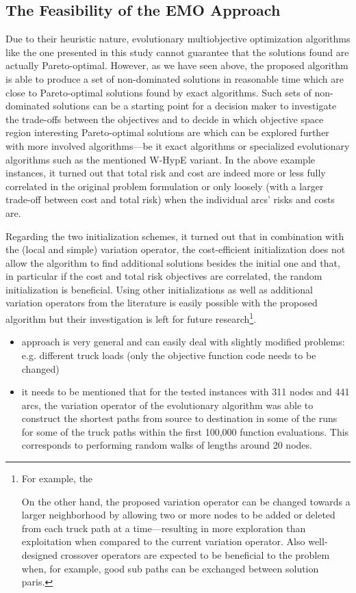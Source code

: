 \documentclass[preprint,12pt]{elsarticle}
\begin{document}
\subsection{The Feasibility of the EMO Approach}
Due to their heuristic nature, evolutionary multiobjective optimization algorithms like the one presented in this study cannot guarantee that the solutions found are actually Pareto-optimal. However, as we have seen above, the proposed algorithm is able to produce a set of non-dominated solutions in reasonable time which are close to Pareto-optimal solutions found by exact algorithms. Such sets of non-dominated solutions can be a starting point for a decision maker to investigate the trade-offs between the objectives and to decide in which objective space region interesting Pareto-optimal solutions are which can be explored further with more involved algorithms---be it exact algorithms or specialized evolutionary algorithms such as the mentioned W-HypE variant. In the above example instances, it turned out that total risk and cost are indeed more or less fully correlated in the original problem formulation or only loosely (with a larger trade-off between cost and total risk) when the individual arcs' risks and costs are.

Regarding the two initialization schemes, it turned out that in combination with the (local and simple) variation operator, the cost-efficient initialization does not allow the algorithm to find additional solutions besides the initial one and that, in particular if the cost and total risk objectives are correlated, the random initialization is beneficial. Using other initializations as well as additional variation operators from the literature is easily possible with the proposed algorithm but their investigation is left for future research\footnote{For example, the 

On the other hand, the proposed variation operator can be changed towards a larger neighborhood by allowing two or more nodes to be added or deleted from each truck path at a time---resulting in more exploration than exploitation when compared to the current variation operator. Also well-designed crossover operators are expected to be beneficial to the problem when, for example, good sub paths can be exchanged between solution paris.
}.




\begin{itemize}
	
	\item approach is very general and can easily deal with slightly modified problems: e.g. different truck loads (only the objective function code needs to be changed)
	\item it needs to be mentioned that for the tested instances with 311 nodes and 441 arcs, the variation operator of the evolutionary algorithm was able to construct the shortest paths from source to destination in some of the runs for some of the truck paths within the first 100,000 function evaluations. This corresponds to performing random walks of lengths around 20 nodes.
\end{itemize}
\end{document}
